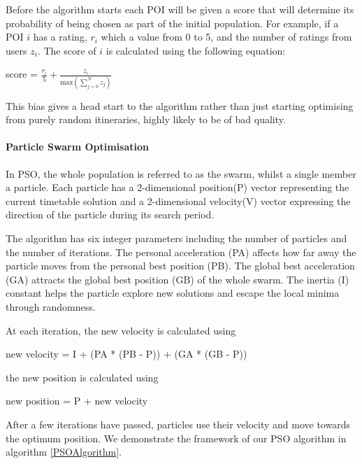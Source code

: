 Before the algorithm starts each POI will be given a score 
that will determine its probability of being chosen as
part of the initial population. For example, if a
POI $i$ has a rating, 
$r_i$ which a value from 0 to 5, and
the number of ratings from users $z_i$. The score of $i$
is calculated using the following equation:

    \begin{center}
        score = $\frac{r_i}{5}+\frac{z_i}{\text{max}(\sum_{j=0}^{N}{z_j})}$

    \end{center}

This bias gives a head start to the algorithm
rather than just starting optimising from purely
random itineraries, highly likely to be of bad
quality.

%


\paragraph{Particle Swarm Optimisation}

In PSO, the whole population is referred to as the
swarm, whilst a single member a particle. Each
particle has a 2-dimensional position(P) vector
representing the current timetable solution and a
2-dimensional velocity(V) vector expressing the direction
of the particle during its search period. 

The algorithm has six integer parameters including the
number of particles and the number of iterations. The
personal acceleration (PA) affects how far away the
particle moves from the personal best position (PB). 
The global best acceleration (GA) attracts the global
best position (GB) of the whole swarm. 
The inertia (I) constant helps the particle
explore new solutions and escape the local minima
through randomness. 

At each
iteration, the new velocity is calculated using
\begin{center}
    new velocity = I + (PA * (PB - P)) + (GA * (GB - P))
\end{center}

the new position is calculated using
\begin{center}
    new position = P + new velocity 
\end{center}

After a few iterations have passed, particles use
their velocity and move towards the optimum position.
We demonstrate the framework of our PSO algorithm in
algorithm \ref{PSOAlgorithm}.


